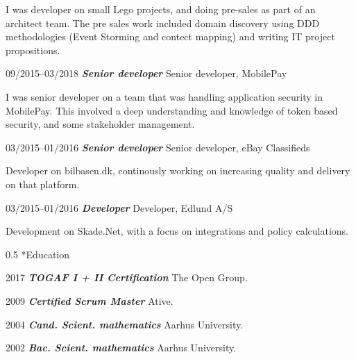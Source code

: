 \documentclass[10pt,a4,sans]{article}
\makeatletter
\renewcommand{\section}{\@startsection{section}{12}
{0mm} 
{0.8\baselineskip} %
{0.5\baselineskip} %
{\Large\scshape
\vspace{0.5\baselineskip}
}}
\makeatother
\begin{document}
\begin{CV}
I was developer on small Lego projects, and doing pre-sales as part of an architect team. The pre sales work included domain discovery using DDD methodologies (Event Storming and contect mapping) and writing IT project propositions.
 
    \item[09/2015--03/2018] \textbf{\emph{Senior developer}} Senior developer, MobilePay 

I was senior developer on a team that was handling application security in MobilePay. This involved a deep understanding and knowledge of token based security, and some stakeholder management.

    \item[03/2015--01/2016] \textbf{\emph{Senior developer}} Senior developer, eBay Classifieds 
    
    Developer on bilbasen.dk, continously working on increasing quality and delivery on that platform.

    \item[03/2015--01/2016] \textbf{\emph{Developer}} Developer, Edlund A/S 
    
    Development on Skade.Net, with a focus on integrations and policy calculations.
    
\end{CV}

\section*{Education}

\begin{CV}
    \item[2017] \textbf{\emph{TOGAF I + II Certification}} The Open Group.
    \item[2009] \textbf{\emph{Certified Scrum Master}} Ative.
    \item[2004] \textbf{\emph{Cand. Scient. mathematics}} Aarhus University.
    \item[2002] \textbf{\emph{Bac. Scient. mathematics}} Aarhus University.
\end{CV}
\end{document}
